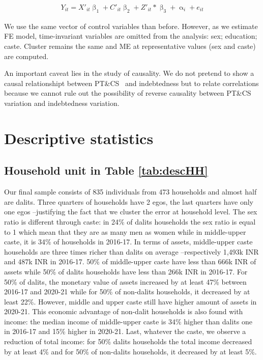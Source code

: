 \documentclass[a4paper, 11pt, onecolumn]{article}
\newcommand{\PTCS}{PT\&CS}
\begin{document}
\begin{equation}\label{eq:fe}
\begin{split}
Y_{it}=X'_{it}\upbeta_{1}+C'_{it}\upbeta_{2}+Z'_{it}*\upbeta_{3}+\upalpha_{i}+e_{it}
\end{split}
\end{equation}

We use the same vector of control variables than before.
However, as we estimate FE model, time-invariant variables are omitted from the analysis: sex; education; caste. 
Cluster remains the same and ME at representative values (sex and caste) are computed.

An important caveat lies in the study of causality.
We do not pretend to show a causal relationshipt between \PTCS~ and indebtedness but to relate correlations because we cannot rule out the possibility of reverse causality between \PTCS~ variation and indebtedness variation.



\section{Descriptive statistics}

	\subsection{Household unit in Table \ref{tab:descHH}}

Our final sample consists of 835 individuals from 473 households and almost half are dalits.
Three quarters of households have 2 egos, the last quarters have only one egos --justifying the fact that we cluster the error at household level.
The sex ratio is different through caste: in 24\% of dalits households the sex ratio is equal to 1 which mean that they are as many men as women while in middle-upper caste, it is 34\% of households in 2016-17.
In terms of assets, middle-upper caste households are three times richer than dalits on average --respectively 1,493k INR and 487k INR in 2016-17.
50\% of middle-upper caste have less than 666k INR of assets while 50\% of dalits households have less than 266k INR in 2016-17.
For 50\% of dalits, the monetary value of assets increased by at least 47\% between 2016-17 and 2020-21 while for 50\% of non-dalits households, it decreased by at least 22\%.
However, middle and upper caste still have higher amount of assets in 2020-21.
This economic advantage of non-dalit households is also found with income: the median income of middle-upper caste is 34\% higher than dalits one in 2016-17 and 15\% higher in 2020-21.
Last, whatever the caste, we observe a reduction of total income: for 50\% dalits households the total income decreased by at least 4\% and for 50\% of non-dalits households, it decreased by at least 5\%.
		
\end{document}
